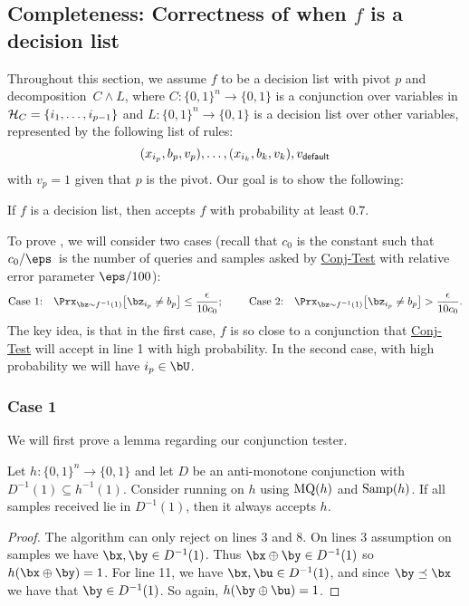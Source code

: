 \documentclass[11pt]{article}
\theoremstyle{definition}
\begin{document}
\subsection{Completeness: 
 Correctness of  when $f$ is a decision list}
 \label{sec:completeness}

Throughout this section, we assume $f$ to be a decision list with 
  pivot $p$ and decomposition~$C\land L$,
  where
$C:\{0,1\}^n\rightarrow \{0,1\}$ is a conjunction over variables in ${\cal H}_C=\{i_1,\ldots,i_{p-1}\}$ and 
$L:\{0,1\}^n\rightarrow \{0,1\}$ is a decision list over other variables,
  represented by the following list of rules: $$(x_{i_p}, b_{p},v_p), \ldots, (x_{i_k}, b_k, v_k), v_{\mathsf{default}}$$
with $v_p=1$ given that $p$ is the pivot.
  Our goal is to show the following:
\begin{theorem}\label{thm: when f is a DL}
If $f$ is a decision list, then  accepts $f$ with probability at least $0.7$.
\end{theorem}

To prove , we will  consider two cases (recall that $c_0$ is the constant such that $c_0/\eps$~is the number of 
    queries and samples asked by \hyperlink{Algorithm2}{\sc Conj-Test} with relative error parameter $\eps/100$):
$$
\text{Case $1$:}\quad
\Prx_{\bz \sim f^{-1}(1)}\big[\bz_{i_p} \neq b_p\big] \leq \frac{\epsilon}{10c_0};
\qquad\text{ Case $2$:}\quad 
 \Prx_{\bz \sim f^{-1}(1)}\big[\bz_{i_p} \neq b_p\big] > \frac{\epsilon}{10c_0}.
$$
The key idea, is that in the first case, $f$ is so close to a conjunction that \hyperlink{Algorithm2}{\sc Conj-Test}
will accept in line 1 with high probability. In the second case, with high probability we will have $i_p \in \bU$. 

\subsubsection{Case 1}
We will first prove a lemma regarding our conjunction tester.


\begin{lemma}\label{lem:simple1}
    Let $h : \{0,1\}^n \to \{0,1\}$ and let $D$ be an anti-monotone conjunction with $D^{-1}(1)\subseteq h^{-1}(1)$. Consider running  on $h$ using $\mathrm{MQ}(h)$ and $\mathrm{Samp}(h)$. 
    If all samples  received lie in $D^{-1}(1)$, then it always accepts $h$.\end{lemma}
\begin{proof}
    The algorithm can only reject on lines 3 and 8.
    On lines $3$ assumption on samples we have $\bx, \by \in D^{-1}(1)$. Thus $\bx \oplus \by \in D^{-1}(1)$ so $h(\bx \oplus \by)=1$. 
For line 11, we have $\bx,\bu \in D^{-1}(1)$, and since $\by \preceq \bx$ we have that $\by\in D^{-1}(1)$.
So again, $h(\by \oplus \bu)=1$.
\end{proof}
\end{document}
